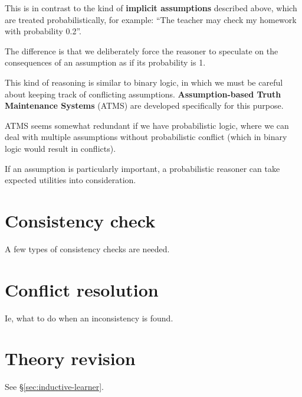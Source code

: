 This is in contrast to the kind of \textbf{implicit assumptions} described above, which are treated probabilistically, for example:  ``The teacher may check my homework with probability 0.2''.

The difference is that we deliberately force the reasoner to speculate on the consequences of an assumption as if its probability is 1.

This kind of reasoning is similar to binary logic, in which we must be careful about keeping track of conflicting assumptions.  \textbf{Assumption-based Truth Maintenance Systems} (ATMS) are developed specifically for this purpose.

ATMS seems somewhat redundant if we have probabilistic logic, where we can deal with multiple assumptions without probabilistic conflict (which in binary logic would result in conflicts).

If an assumption is particularly important, a probabilistic reasoner can take expected utilities into consideration.

\section{Consistency check}
\label{sec:consistency-check}

A few types of consistency checks are needed.

\section{Conflict resolution}
\label{sec:conflict-resolution}

Ie, what to do when an inconsistency is found.

\section{Theory revision}

See \S\ref{sec:inductive-learner}.

